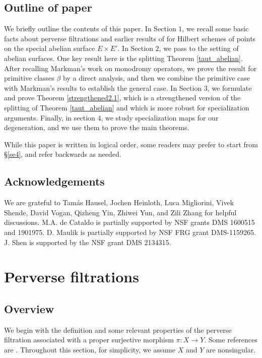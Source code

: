 \documentclass[11pt]{amsart}
\theoremstyle{plain}
\theoremstyle{definition}
\theoremstyle{remark}
\begin{document}
\subsection{Outline of paper}

We briefly outline the contents of this paper.  In Section $1$, we recall some basic facts about perverse filtrations and earlier results of \cite{Z,SZ} for Hilbert schemes of points on the special abelian surface $E \times E'$.
In Section $2$, we pass to the setting of abelian surfaces.  One  key result  here is the splitting Theorem \ref{taut_abelian}.  After recalling Markman's work on monodromy operators, we prove the result for primitive classes $\beta$ by a direct analysis, and then we combine the primitive case with Markman's results  to establish the general case.
In Section $3$, we formulate and prove  Theorem \ref{strengthened2.1},  which is a strengthened version of the splitting of Theorem \ref{taut_abelian} and which  is  more robust for specialization arguments.
Finally, in section $4$, we study  specialization maps for our degeneration, and we use them to prove the main theorems.

While this paper is written in logical order, some readers may prefer to start from \S\ref{se4}, and refer backwards as needed.




\subsection{Acknowledgements}
We are grateful to Tam\'as Hausel, Jochen Heinloth, Luca Migliorini, Vivek Shende, David Vogan, Qizheng Yin, Zhiwei Yun, and Zili Zhang for helpful discussions.  M.A. de Cataldo is partially supported by NSF grants DMS 1600515 and 1901975.  D. Maulik is partially supported by NSF FRG grant DMS-1159265. J. Shen is supported by the NSF grant DMS 2134315.


\section{Perverse filtrations} \label{sec1}

\subsection{Overview}
We begin with the definition and some relevant properties of the perverse filtration associated with a proper surjective morphism $\pi: X\rightarrow Y$. Some  references are \cite{BBD, dCM0, dCM1, WSB}. 
Throughout this section, for simplicity, we assume $X$ and $Y$ are nonsingular.
\end{document}
